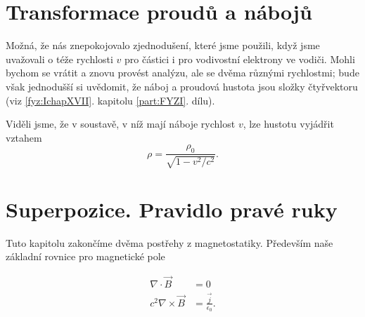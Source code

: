   \section{Transformace proudů a nábojů}\label{fyz:IIchapXIIIsecVII}
    Možná, že nás znepokojovalo zjednodušení, které jsme použili, když jsme uvažovali o téže
    rychlosti \(v\) pro částici i pro vodivostní elektrony ve vodiči. Mohli bychom se vrátit a znovu
    provést analýzu, ale se dvěma různými rychlostmi; bude však jednodušší si uvědomit, že náboj a
    proudová hustota jsou složky čtyřvektoru (viz \ref{fyz:IchapXVII}. kapitolu \ref{part:FYZI}.
    dílu). 
    
    Viděli jsme, že v soustavě, v níž mají náboje rychlost \(v\), lze hustotu vyjádřit vztahem
    \begin{equation*}
      ρ=\dfrac{ρ_0}{\sqrt{1−v^2/c^2}}.
    \end{equation*}
  

  \section{Superpozice. Pravidlo pravé ruky}\label{fyz:IIchapXIIIsecVIII}
    Tuto kapitolu zakončíme dvěma postřehy z magnetostatiky. Především naše základní rovnice pro
    magnetické pole

      \begin{align*}
        \nabla\cdot\vec{B}     &= 0                             \\
        c^2\nabla\times\vec{B} &= \frac{\vec{j}}{\epsilon_0}.  
      \end{align*}

